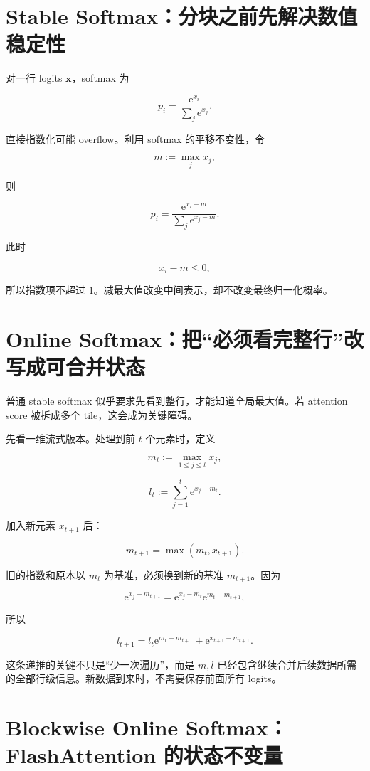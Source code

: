 \documentclass[profile=standard,twoside=false]{ipara-handbook}
\begin{document}
\section{Stable Softmax：分块之前先解决数值稳定性}

对一行 logits $\boldsymbol{x}$，softmax 为

$$
p_i
=\frac{\mathrm{e}^{x_i}}
{\sum_j\mathrm{e}^{x_j}}.
$$

直接指数化可能 overflow。利用 softmax 的平移不变性，令

$$
m:=\max_j x_j,
$$

则

$$
\boxed{
 p_i
 =\frac{\mathrm{e}^{x_i-m}}
 {\sum_j\mathrm{e}^{x_j-m}}
}.
$$

此时

$$
x_i-m\le0,
$$

所以指数项不超过 $1$。减最大值改变中间表示，却不改变最终归一化概率。

\section{Online Softmax：把“必须看完整行”改写成可合并状态}

普通 stable softmax 似乎要求先看到整行，才能知道全局最大值。若 attention score 被拆成多个 tile，这会成为关键障碍。

先看一维流式版本。处理到前 $t$ 个元素时，定义

$$
m_t
:=\max_{1\le j\le t}x_j,
$$

$$
l_t
:=\sum_{j=1}^{t}\mathrm{e}^{x_j-m_t}.
$$

加入新元素 $x_{t+1}$ 后：

$$
m_{t+1}=\max(m_t,x_{t+1}).
$$

旧的指数和原本以 $m_t$ 为基准，必须换到新的基准 $m_{t+1}$。因为

$$
\mathrm{e}^{x_j-m_{t+1}}
=\mathrm{e}^{x_j-m_t}
 \mathrm{e}^{m_t-m_{t+1}},
$$

所以

$$
\boxed{
 l_{t+1}
 =l_t\mathrm{e}^{m_t-m_{t+1}}
 +\mathrm{e}^{x_{t+1}-m_{t+1}}
}.
$$

这条递推的关键不只是“少一次遍历”，而是 $m,l$ 已经包含继续合并后续数据所需的全部行级信息。新数据到来时，不需要保存前面所有 logits。

\section{Blockwise Online Softmax：FlashAttention 的状态不变量}
\end{document}
